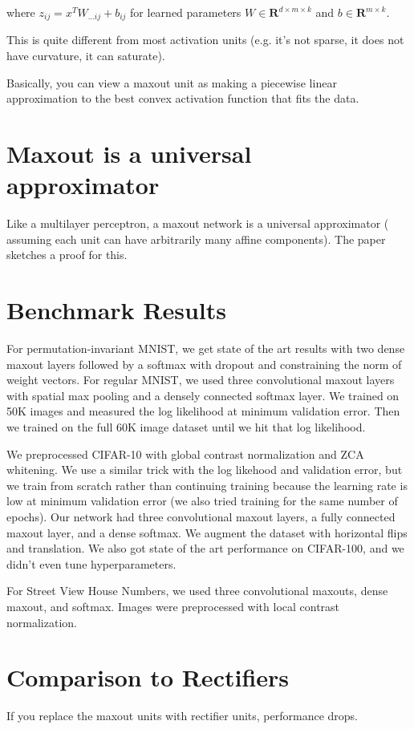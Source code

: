 \documentclass[a4paper]{article}
\begin{document}
where $z_{ij} = x^T W_{...ij} + b_{ij}$ for learned parameters
$W \in \mathbf{R}^{d \times m \times k}$ and $b \in \mathbf{R}^{m \times k}$.

This is quite different from most activation units (e.g. it's not sparse, it
does not have curvature, it can saturate).

Basically, you can view a maxout unit as making a piecewise linear approximation
to the best convex activation function that fits the data.

\section{Maxout is a universal approximator}
Like a multilayer perceptron, a maxout network is a universal approximator (
assuming each unit can have arbitrarily many affine components).
The paper sketches a proof for this.

\section{Benchmark Results}
For permutation-invariant MNIST, we get state of the art results with two dense
maxout layers followed by a softmax with dropout and constraining the norm of
weight vectors. For regular MNIST, we used three convolutional maxout layers
with spatial max pooling and a densely connected softmax layer. We trained on
50K images and measured the log likelihood at minimum validation error. Then
we trained on the full 60K image dataset until we hit that log likelihood.

We preprocessed CIFAR-10 with global contrast normalization and ZCA whitening.
We use a similar trick with the log likehood and validation error, but we train
from scratch rather than continuing training because the learning rate is low
at minimum validation error (we also tried training for the same number of
epochs). Our network had three convolutional maxout layers, a fully connected
maxout layer, and a dense softmax. We augment the dataset with horizontal
flips and translation. We also got state of the art performance on CIFAR-100,
and we didn't even tune hyperparameters.

For Street View House Numbers, we used three convolutional maxouts, dense
maxout, and softmax. Images were preprocessed with local contrast normalization.

\section{Comparison to Rectifiers}
If you replace the maxout units with rectifier units, performance drops.
\end{document}
